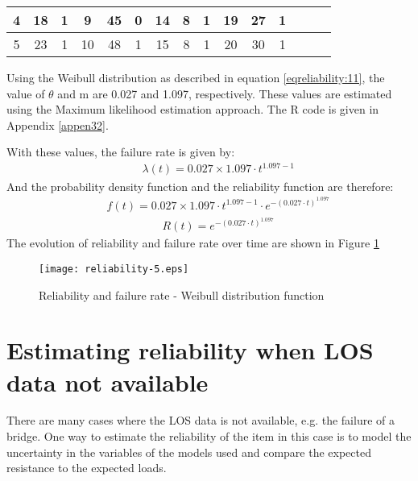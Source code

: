 \begin{table}[h]
\begin{tabular}{|l|l|l|l|l|l|l|l|l|l|l|l|l|l|l|}
\hline
\multicolumn{1}{|c|}{4} & \multicolumn{1}{c|}{18} & \multicolumn{1}{c|}{1} & \multicolumn{1}{c|}{9} & \multicolumn{1}{c|}{45} & \multicolumn{1}{c|}{0} & \multicolumn{1}{c|}{14} & \multicolumn{1}{c|}{8} & \multicolumn{1}{c|}{1} & \multicolumn{1}{c|}{19} & \multicolumn{1}{c|}{27} & \multicolumn{1}{c|}{1} & \multicolumn{1}{c|}{} & \multicolumn{1}{c|}{} & \multicolumn{1}{c|}{} \\ 
\hline
\multicolumn{1}{|c|}{5} & \multicolumn{1}{c|}{23} & \multicolumn{1}{c|}{1} & \multicolumn{1}{c|}{10} & \multicolumn{1}{c|}{48} & \multicolumn{1}{c|}{1} & \multicolumn{1}{c|}{15} & \multicolumn{1}{c|}{8} & \multicolumn{1}{c|}{1} & \multicolumn{1}{c|}{20} & \multicolumn{1}{c|}{30} & \multicolumn{1}{c|}{1} & \multicolumn{1}{c|}{} & \multicolumn{1}{c|}{} & \multicolumn{1}{c|}{} \\ 
\hline
\end{tabular}\vspace{2pt}
\label{tbl-reliability:1}\end{table}
Using the Weibull distribution as described in equation \eqref{eqreliability:11}, the value of
$\theta $ and m are 0.027 and 1.097, respectively. These values are estimated
using the Maximum likelihood estimation approach. The R code is given in Appendix
\ref{appen32}.

With these values, the failure rate is given by:
\begin{eqnarray}
&& \lambda (t) = 0.027 \times 1.097 \cdot {t^{1.097 - 1}}
\nonumber
\end{eqnarray}
And the probability density function and the reliability function are therefore:
\begin{eqnarray}
&& f(t) = 0.027 \times 1.097 \cdot {t^{1.097 - 1}} \cdot {e^{ - {{(0.027 \cdot
t)}^{1.097}}}}
\nonumber
\end{eqnarray}
\begin{eqnarray}
&& R(t) = {e^{ - {{(0.027 \cdot t)}^{1.097}}}}
\nonumber
\end{eqnarray}
The evolution of reliability and failure rate over time are shown in Figure \ref{reliability-5}\pagebreak{}
\begin{figure}[h]
\texttt{[image: reliability-5.eps]}
\caption{Reliability and failure rate - Weibull distribution
function}\label{reliability-5}
\end{figure}
\section{Estimating reliability when LOS data not available}
There are many cases where the LOS data is not available, e.g. the failure of a
bridge. One way to estimate the reliability of the item in this case is to model
the uncertainty in the variables of the models used and compare the expected
resistance to the expected loads.
%
